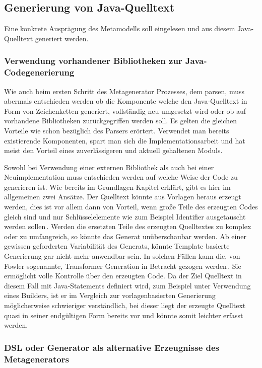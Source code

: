 \documentclass[12pt,oneside,a4paper,parskip]{scrbook}
\begin{document}
\subsection{Generierung von Java-Quelltext}

Eine konkrete Ausprägung des Metamodells soll eingelesen und aus diesem Java-Quelltext generiert werden.

\subsubsection{Verwendung vorhandener Bibliotheken zur Java-Codegenerierung}

Wie auch beim ersten Schritt des Metagenerator Prozesses, dem parsen, muss abermals entschieden werden ob die Komponente welche den Java-Quelltext in Form von Zeichenketten generiert, vollständig neu umgesetzt wird oder ob auf vorhandene Bibliotheken zurückgegriffen werden soll. Es gelten die gleichen Vorteile wie schon bezüglich des Parsers erörtert. Verwendet man bereits existierende Komponenten, spart man sich die Implementationsarbeit und hat meist den Vorteil eines zuverlässigeren und aktuell gehaltenen Moduls.

Sowohl bei Verwendung einer externen Bibliothek als auch bei einer Neuimplementation muss entschieden werden auf welche Weise der Code zu generieren ist. Wie bereits im Grundlagen-Kapitel erklärt, gibt es hier im allgemeinen zwei Ansätze. Der Quelltext könnte aus Vorlagen heraus erzeugt werden, dies ist vor allem dann von Vorteil, wenn große Teile des erzeugten Codes gleich sind und nur Schlüsselelemente wie zum Beispiel Identifier ausgetauscht werden sollen\,\cite[S. 125]{fowler2010}. Werden die ersetzten Teile des erzeugten Quelltextes zu komplex oder zu umfangreich, so könnte das Generat unüberschaubar werden. Ab einer gewissen geforderten Variabilität des Generats, könnte Template basierte Generierung gar nicht mehr anwendbar sein. In solchen Fällen kann die, von Fowler sogenannte, Transformer Generation in Betracht gezogen werden\,\cite[S. 125]{fowler2010}. Sie ermöglicht volle Kontrolle über den erzeugten Code. Da der Ziel Quelltext in diesem Fall mit Java-Statements definiert wird, zum Beispiel unter Verwendung eines Builders, ist er im Vergleich zur vorlagenbasierten Generierung möglicherweise schwieriger verständlich, bei dieser liegt der erzeugte Quelltext quasi in seiner endgültigen Form bereits vor und könnte somit leichter erfasst werden.

\subsubsection{DSL oder Generator als alternative Erzeugnisse des Metagenerators}
\end{document}
